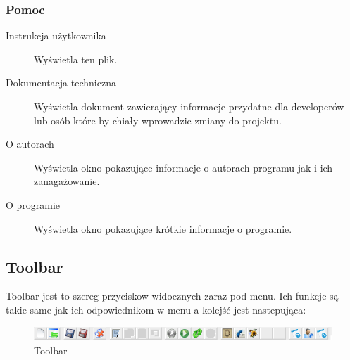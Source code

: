 \documentclass[a4paper,10pt]{article}
\begin{document}
\subsubsection{Pomoc}
\begin{description}
\item [Instrukcja użytkownika] Wyświetla ten plik.
\item [Dokumentacja techniczna] Wyświetla dokument zawierający informacje przydatne dla developerów lub osób które by chiały wprowadzic zmiany do projektu.
\item [O autorach] Wyświetla okno pokazujące informacje o autorach programu jak i ich zanagażowanie.
\item [O programie] Wyświetla okno pokazujące krótkie informacje o programie.
\end{description}

\subsection{Toolbar}
Toolbar jest to szereg przyciskow widocznych zaraz pod menu. Ich funkcje są takie same jak ich odpowiednikom w menu a kolejść jest nastepująca:
\begin{figure}[h]
 \centering
 \includegraphics[scale=0.5]{toolbar}
 \caption{Toolbar}
 \label{fig:Toolbar}
\end{figure}
\end{document}
